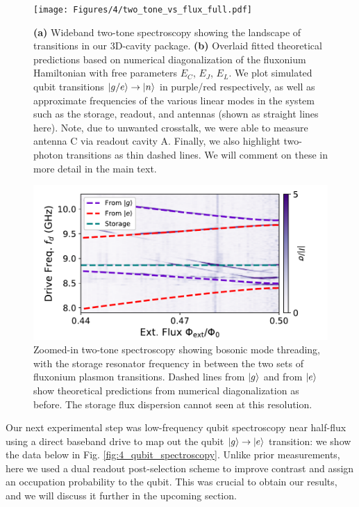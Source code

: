 \begin{figure}[t]
    \centering
    \texttt{[image: Figures/4/two\_tone\_vs\_flux\_full.pdf]}
    \caption[Wideband two-tone spectroscopy showing the landscape of transitions in our 3D-cavity package.]{\textbf{(a)} Wideband two-tone spectroscopy showing the landscape of transitions in our 3D-cavity package. \textbf{(b)} Overlaid fitted theoretical predictions based on numerical diagonalization of the fluxonium Hamiltonian with free parameters $E_C$, $E_J$, $E_L$. We plot simulated qubit transitions $\lvert g/e\rangle\to\lvert n\rangle$ in purple/red respectively, as well as approximate frequencies of the various linear modes in the system such as the storage, readout, and antennas (shown as straight lines here). Note, due to unwanted crosstalk, we were able to measure antenna C via readout cavity A. Finally, we also highlight two-photon transitions as thin dashed lines. We will comment on these in more detail in the main text.}
\label{fig:4_two_tone_vs_flux_full}
\end{figure}
\clearpage
\begin{figure}[hp]
    \centering
    \includegraphics[width=0.73\linewidth]{Figures/4/two_tone_vs_flux_zoom.pdf}
    \caption[Zoomed-in two-tone spectroscopy showing bosonic mode threading of the storage resonator frequency between the fluxonium plasmon transitions.]{Zoomed-in two-tone spectroscopy showing bosonic mode threading, with the storage resonator frequency in between the two sets of fluxonium plasmon transitions. Dashed lines from $\lvert g\rangle$ and from $\lvert e\rangle$ show theoretical predictions from numerical diagonalization as before. The storage flux dispersion cannot seen at this resolution.}
\label{fig:4_two_tone_vs_flux_zoom}
\end{figure}

Our next experimental step was low-frequency qubit spectroscopy near half-flux using a direct baseband drive to map out the qubit  $\lvert g\rangle\to\lvert e\rangle$ transition: we show the data below in Fig. \ref{fig:4_qubit_spectroscopy}. Unlike prior measurements, here we used a dual readout post-selection scheme \cite{ding2023FTF} to improve contrast and assign an occupation probability to the qubit. This was crucial to obtain our results, and we will discuss it further in the upcoming section.

